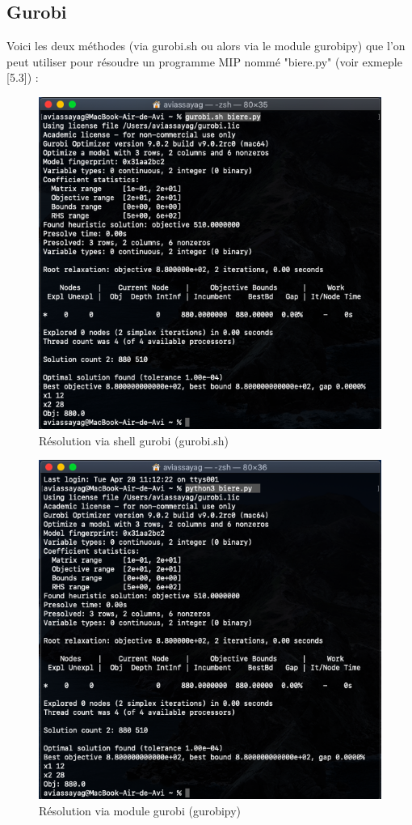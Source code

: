 \documentclass[a4paper, 12pt, twoside]{article}
\begin{document}
\subsection{Gurobi}
Voici les deux méthodes (via gurobi.sh ou alors via le module gurobipy) que l'on peut utiliser pour résoudre un programme MIP nommé "biere.py" (voir exmeple [5.3]) :
\begin{center}
\begin{figure}[h]
\centering
\includegraphics[scale=0.4]{gurobish.png}
\caption{Résolution via shell gurobi (gurobi.sh)}
\end{figure}
\begin{figure}[h]
\centering
\includegraphics[scale=0.4]{gurobipython.png}
\caption{Résolution via module gurobi (gurobipy)}
\end{figure}
\end{center}
\end{document}
